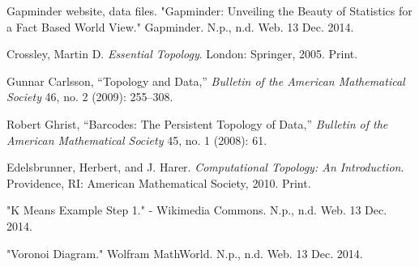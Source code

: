 \documentclass[11pt]{amsart}
\theoremstyle{remark}	  \newtheorem*{remark}{Remark}
\numberwithin{equation}{section}
\begin{document}
\newpage
\begin{thebibliography}{11}

 Gapminder website, data files. 
"Gapminder: Unveiling the Beauty of Statistics for a Fact Based World View." Gapminder. N.p., n.d. Web. 13 Dec. 2014.

 Crossley, Martin D. \emph{Essential Topology}. London: Springer, 2005. Print. 

 Gunnar Carlsson, “Topology and Data,” \emph{Bulletin of the American Mathematical Society} 46, no. 2 (2009): 255–308.

 Robert Ghrist, “Barcodes: The Persistent Topology of Data,” \emph{Bulletin of the American Mathematical Society} 45, no. 1 (2008): 61.

Edelsbrunner, Herbert, and J. Harer. \emph{Computational Topology: An Introduction}. Providence, RI: American Mathematical Society, 2010. Print. 

"K Means Example Step 1." - Wikimedia Commons. N.p., n.d. Web. 13 Dec. 2014.

"Voronoi Diagram." Wolfram MathWorld. N.p., n.d. Web. 13 Dec. 2014.

\end{thebibliography}
\end{document}
